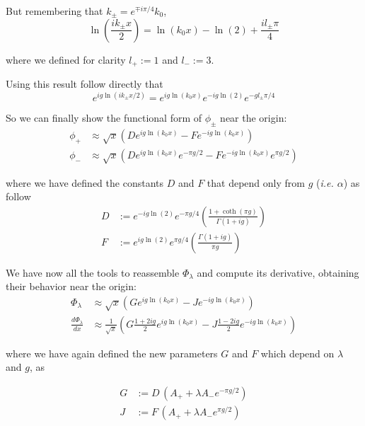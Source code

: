 \noindent
But remembering that $k_\pm = e^{\mp i\pi/4} k_0$,
\begin{equation*}
    \ln(\frac{ik_\pm x}{2}) = \ln(k_0 x)-\ln(2)+ \frac{i l_\pm \pi}{4}
\end{equation*}

where we defined for clarity $l_+ := 1$ and $l_- := 3$.

\noindent
Using this result follow directly that
\begin{equation*}
    e^{ig \ln(ik_\pm x/2)} = e^{ig \ln(k_0 x)}e^{-ig\ln(2)}e^{-g l_\pm \pi/4}
\end{equation*}

\noindent
So we can finally show the functional form of $\phi_\pm$ near the origin:
\begin{align*}
    \phi_+ & \approx \sqrt{x}\left(  D e^{ig \ln(k_0 x)} - F e^{-ig \ln(k_0 x)} \right)                            \\
    \phi_- & \approx \sqrt{x}\left(  D e^{ig \ln(k_0 x)} e^{-\pi g /2} - F e^{-ig \ln(k_0 x)} e^{\pi g /2} \right)
\end{align*}

where we have defined the constants $D$ and $F$ that depend only from $g$ (\textit{i.e. $\alpha$}) as follow
\begin{align*}
    D & := e^{-ig \ln(2)}e^{-\pi g/4}\left( \frac{1 + \coth(\pi g)}{\Gamma(1+ig)}\right) \\
    F & := e^{ig \ln(2)}e^{\pi g/4}\left( \frac{\Gamma(1+ig)}{\pi g}\right)
\end{align*}

\noindent
We have now all the tools to reassemble $\Phi_\lambda$ and compute its derivative, obtaining their behavior near the origin:
\begin{align}
    \Phi_\lambda             & \approx \sqrt{x} \left( G e^{ig \ln(k_0 x)} - J e^{-ig \ln(k_0 x)} \right)                                           \\
    \frac{d\Phi_\lambda}{dx} & \approx \frac{1}{\sqrt{x}} \left( G \frac{1+2ig}{2} e^{ig \ln(k_0 x)} - J \frac{1-2ig}{2} e^{-ig \ln(k_0 x)} \right)
    \label{eq:potential_Phi_deriv}
\end{align}

where we have again defined the new parameters $G$ and $F$ which depend on $\lambda$ and $g$, as

\begin{align*}
    G & := D \, (A_+ +\lambda A_- e^{-\pi g/2}) \\
    J & := F \, (A_+ +\lambda A_- e^{\pi g/2})
\end{align*}

